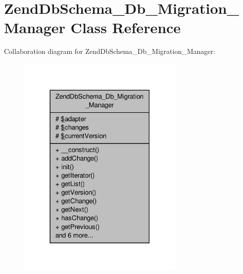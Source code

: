 \hypertarget{classZendDbSchema__Db__Migration__Manager}{\section{Zend\-Db\-Schema\-\_\-\-Db\-\_\-\-Migration\-\_\-\-Manager Class Reference}
\label{classZendDbSchema__Db__Migration__Manager}
}


Collaboration diagram for Zend\-Db\-Schema\-\_\-\-Db\-\_\-\-Migration\-\_\-\-Manager\-:\nopagebreak
\begin{figure}[H]
\begin{center}
\leavevmode
\includegraphics[width=230pt]{classZendDbSchema__Db__Migration__Manager__coll__graph}
\end{center}
\end{figure}
